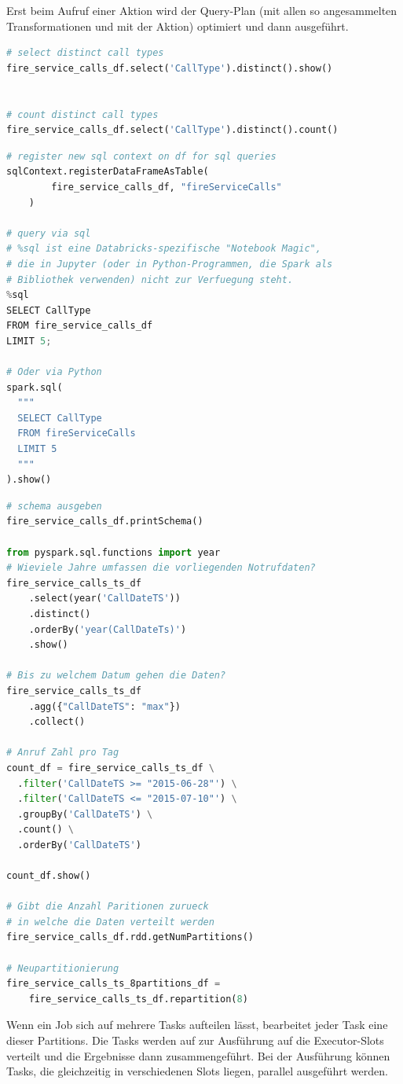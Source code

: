 \documentclass[../Main.tex]{subfiles}
\begin{document}
Erst beim Aufruf einer Aktion wird der Query-Plan (mit allen so angesammelten Transformationen und mit der Aktion)
optimiert und dann ausgeführt.

\begin{lstlisting}[language=Python]
# select distinct call types
fire_service_calls_df.select('CallType').distinct().show()


# count distinct call types
fire_service_calls_df.select('CallType').distinct().count()
\end{lstlisting}

\begin{lstlisting}[language=Python]
# register new sql context on df for sql queries
sqlContext.registerDataFrameAsTable(
        fire_service_calls_df, "fireServiceCalls"
    )

# query via sql
# %sql ist eine Databricks-spezifische "Notebook Magic", 
# die in Jupyter (oder in Python-Programmen, die Spark als 
# Bibliothek verwenden) nicht zur Verfuegung steht.
%sql
SELECT CallType
FROM fire_service_calls_df
LIMIT 5;

# Oder via Python
spark.sql(
  """
  SELECT CallType
  FROM fireServiceCalls
  LIMIT 5
  """
).show()
\end{lstlisting}


\begin{lstlisting}[language=Python]
# schema ausgeben
fire_service_calls_df.printSchema()

from pyspark.sql.functions import year
# Wieviele Jahre umfassen die vorliegenden Notrufdaten?
fire_service_calls_ts_df
    .select(year('CallDateTS'))
    .distinct()
    .orderBy('year(CallDateTs)')
    .show()

# Bis zu welchem Datum gehen die Daten?
fire_service_calls_ts_df
    .agg({"CallDateTS": "max"})
    .collect()

# Anruf Zahl pro Tag
count_df = fire_service_calls_ts_df \
  .filter('CallDateTS >= "2015-06-28"') \
  .filter('CallDateTS <= "2015-07-10"') \
  .groupBy('CallDateTS') \
  .count() \
  .orderBy('CallDateTS')

count_df.show()

# Gibt die Anzahl Paritionen zurueck
# in welche die Daten verteilt werden
fire_service_calls_df.rdd.getNumPartitions()

# Neupartitionierung
fire_service_calls_ts_8partitions_df = 
    fire_service_calls_ts_df.repartition(8)
\end{lstlisting}
Wenn ein Job sich auf mehrere Tasks aufteilen lässt, bearbeitet jeder Task eine dieser Partitions.
Die Tasks werden auf zur Ausführung auf die Executor-Slots verteilt und die Ergebnisse dann zusammengeführt.
Bei der Ausführung können Tasks, die gleichzeitig in verschiedenen Slots liegen, parallel ausgeführt werden.
\end{document}
